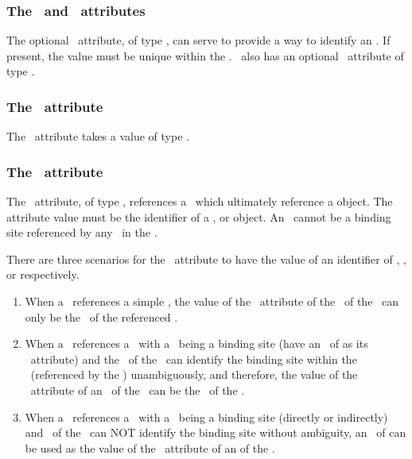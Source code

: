 \subsubsection{The \idAtt\ and \nameAtt\ attributes}
\label{def:OutwardBindingSite:idAndName}

The optional \idAtt\ attribute, of type \SIdPT, can serve to provide a way to identify an \outwardBindingSite. If present, the value must be unique within the \species. \OutwardBindingSite\ also has an optional \nameAtt\ attribute of type \stringPT.

\subsubsection{The \bindingStatusAtt\ attribute}
\label{def:OutwardBindingSite:bindingStatus}

The \bindingStatusAtt\ attribute takes a value of type \BindingStatusPTWC.

\subsubsection{The \componentAtt\ attribute}
\label{def:OutwardBindingSite:component}

The \componentAtt\ attribute, of type \SIdRefPT, references a \component\ which  ultimately reference a \BindingSiteSpeciesType object. The attribute value must be the identifier of a \SpeciesTypeInstance, \SpeciesTypeComponentIndex or \SpeciesType object. An \outwardBindingSite\ cannot be a binding site referenced by any \inSpeciesTypeBond\ in the \species.

There are three scenarios for the \componentAtt\ attribute to have the value of an identifier of \SpeciesType, \SpeciesTypeInstance, or \SpeciesTypeComponentIndex respectively.

\begin{enumerate}[label=(\arabic*)]
 \item When a \species\ references a simple \bindingSiteSpeciesType, the value of the \componentAtt\ attribute of the \outwardBindingSite\ of the \species\ can only be the \idAtt\ of the referenced \speciesType.
 \item When a \species\ references a \speciesType\ with a \speciesTypeInstance\ being a binding site (have an \idAtt\ of \BindingSiteSpeciesType as its \speciesTypeAtt\ attribute) and the \idAtt\ of the \speciesTypeInstance\ can
identify the binding site within the \speciesType\ (referenced by the \species) unambiguously, and therefore, the value of the \componentAtt\ attribute of an \outwardBindingSite\ of the \species\ can be the \idAtt\ of the \speciesTypeInstance.
  \item When a \species\ references a \speciesType\ with a \speciesTypeInstance\ being a binding site (directly or indirectly) and \idAtt\ of the \speciesTypeInstance\ can NOT identify the binding site without ambiguity, an \idAtt\  of \SpeciesTypeComponentIndex can be used as the value of the \componentAtt\ attribute of an  of the \species.
\end{enumerate}


